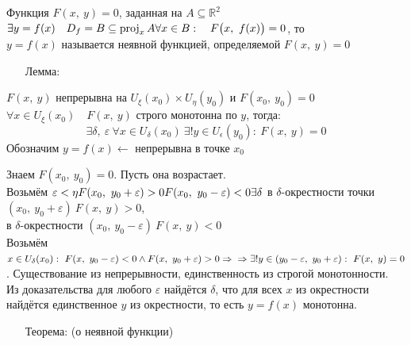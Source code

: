 \documentclass[12pt, letterpaper, twoside]{article}
\newcommand{\mb}[1]{\mathbb{#1}}
\begin{document}
    \begin{enumerate}
        \item[\text{Определение:}]
    \end{enumerate}
    Функция $F(x,\ y) = 0$, заданная на $A \subseteq \mb{R}^2$\\
    $\exists y = f(x)\quad D_f = B\subseteq \operatorname{proj}_x A\\
    \forall x\in B:\quad F\big(x,\ f(x)\big) = 0$, то\\
    $y = f(x)$ называется неявной функцией, определяемой $F(x,\ y) = 0$
    \begin{enumerate}
        \item[Лемма:]
    \end{enumerate}
    $F(x,\ y)$ непрерывна на $U_{\xi}(x_0) \times U_{\eta}(y_0)$ и $F(x_0,\ y_0) = 0$
    $\forall x\in U_{\xi}(x_0)\quad F(x,\ y)$ строго монотонна по $y$, тогда:
    \[\exists \delta,\ \varepsilon\ \forall x\in U_{\delta}(x_0)\ \exists! y\in U_{\epsilon}(y_0):\ F(x,\ y) = 0\]
    Обозначим $y = f(x) \leftarrow$ непрерывна в точке $x_0$\newpage
    \begin{enumerate}
        \item[\text{Доказательство:}]
    \end{enumerate}
    Знаем $F(x_0,\ y_0) = 0$. Пусть она возрастает.\\
    Возьмём $\varepsilon < \eta\\
    F(x_0,\ y_0 + \varepsilon) > 0\\
    F(x_0,\ y_0 - \varepsilon) < 0\\
    \exists \delta$ в $\delta$-окрестности точки $(x_0,\ y_0 + \varepsilon)\ F(x,\ y) > 0$,\\
    в $\delta$-окрестности $(x_0,\ y_0 - \varepsilon)\ F(x,\ y) < 0$\\
    Возьмём $x \in U_{\delta}(x_0):\ F(x,\ y_0 - \varepsilon) < 0 \wedge F(x,\ y_0 + \varepsilon) > 0\Rightarrow\\
    \Rightarrow \exists! y \in (y_0 - \varepsilon,\ y_0 + \varepsilon):\ F(x,\ y) = 0$. Существование из непрерывности, единственность из строгой монотонности.\\
    Из доказательства для любого $\varepsilon$ найдётся $\delta$, что для всех $x$ из окрестности найдётся единственное $y$ из окрестности, то есть $y=f(x)$ монотонна.
    \begin{enumerate}
        \item[Теорема:] (о неявной функции)
    \end{enumerate} 
\end{document}
